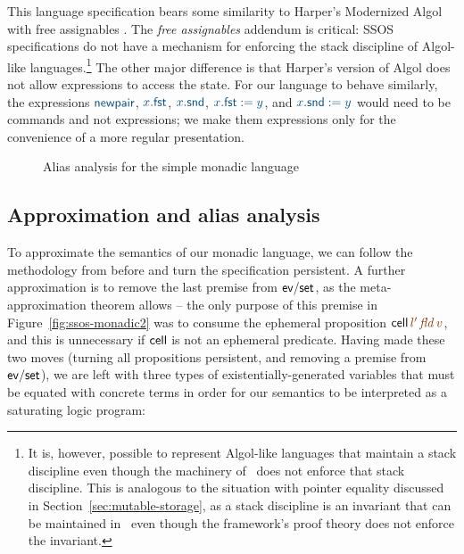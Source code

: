 This language specification bears some similarity to Harper's
Modernized Algol with free assignables \cite[Chapter
36]{harper12practical}. The {\it free assignables} addendum is
critical: SSOS specifications do not have a mechanism for enforcing
the stack discipline of Algol-like languages.\footnote{It is, however,
  possible to represent Algol-like languages that maintain a stack
  discipline even though the machinery of \sls~does not enforce that
  stack discipline. This is analogous to the situation with pointer
  equality discussed in Section~\ref{sec:mutable-storage}, as a stack
  discipline is an invariant that can be maintained in \sls~even
  though the framework's proof theory does not enforce the invariant.}
The other major difference is that Harper's version of Algol does not
allow expressions to access the state.  For our language to behave
similarly, the expressions $\obj{\sf newpair}$, $\obj{x.{\sf fst}}$,
$\obj{x.{\sf snd}}$, $\obj{x.{\sf fst} := y}$, and $\obj{x.{\sf snd}
  := y}$ would need to be commands and not expressions; we make them
expressions only for the convenience of a more regular presentation.

\begin{figure}
\caption{Alias analysis for the simple monadic language}
\label{fig:ssos-monadic-approx}
\end{figure}



\subsection{Approximation and alias analysis}


To approximate the semantics of our monadic language, we can follow the
methodology from before and turn the specification persistent. A further
approximation is to remove the last premise from ${\sf ev/set}$, as
the meta-approximation theorem allows -- the only purpose of this
premise in Figure~\ref{fig:ssos-monadic2} was to consume the ephemeral
proposition ${\sf cell}\,\lf{l'}\,\lf{\it fld}\,\lf{v}$, and this is unnecessary
if ${\sf cell}$ is not an ephemeral predicate.  Having
made these two moves (turning all propositions persistent, and removing
a premise from ${\sf ev/set}$), we are left with three types of
existentially-generated variables that must be equated with concrete
terms in order for our semantics to be interpreted as a saturating
logic program:

